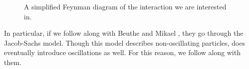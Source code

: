 \documentclass[10pt]{article}
\begin{document}
\begin{figure}[h]
  \centering
    \caption{A simplified Feynman diagram of the interaction we are interested in.}
    \label{fig:feyn}
\end{figure}
In particular, if we follow along with Beuthe and Mikael \cite{Beuthe_2003}, they go through the Jacob-Sachs \cite{sachs} model. Though this model describes non-oscillating particles, \cite{Beuthe_2003} does eventually introduce oscillations as well. For this reason, we follow along with them. 
\end{document}
